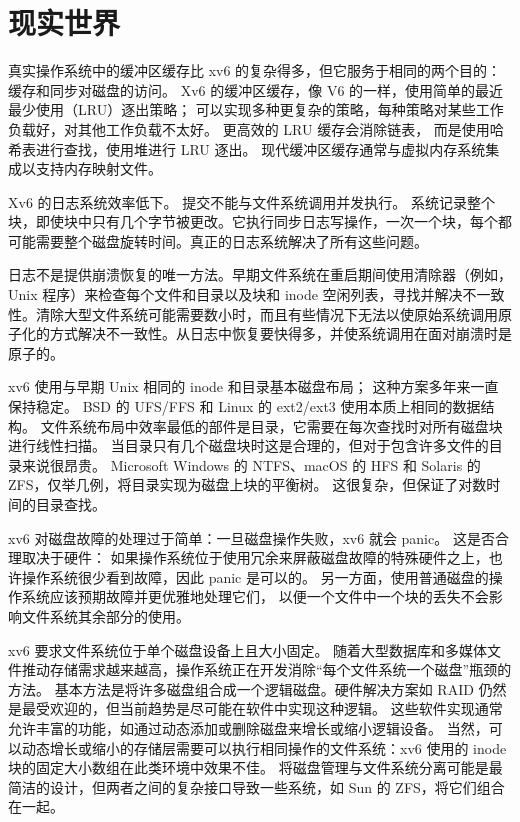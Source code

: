 \section{现实世界}

真实操作系统中的缓冲区缓存比 xv6 的复杂得多，但它服务于相同的两个目的：缓存和同步对磁盘的访问。
Xv6 的缓冲区缓存，像 V6 的一样，使用简单的最近最少使用（LRU）逐出策略；
可以实现多种更复杂的策略，每种策略对某些工作负载好，对其他工作负载不太好。
更高效的 LRU 缓存会消除链表，
而是使用哈希表进行查找，使用堆进行 LRU 逐出。
现代缓冲区缓存通常与虚拟内存系统集成以支持内存映射文件。

Xv6 的日志系统效率低下。
提交不能与文件系统调用并发执行。
系统记录整个块，即使块中只有几个字节被更改。它执行同步日志写操作，一次一个块，每个都可能需要整个磁盘旋转时间。真正的日志系统解决了所有这些问题。

日志不是提供崩溃恢复的唯一方法。早期文件系统在重启期间使用清除器（例如，Unix
程序）来检查每个文件和目录以及块和 inode 空闲列表，寻找并解决不一致性。清除大型文件系统可能需要数小时，而且有些情况下无法以使原始系统调用原子化的方式解决不一致性。从日志中恢复要快得多，并使系统调用在面对崩溃时是原子的。

xv6 使用与早期 Unix 相同的 inode 和目录基本磁盘布局；
这种方案多年来一直保持稳定。
BSD 的 UFS/FFS 和 Linux 的 ext2/ext3 使用本质上相同的数据结构。
文件系统布局中效率最低的部件是目录，它需要在每次查找时对所有磁盘块进行线性扫描。
当目录只有几个磁盘块时这是合理的，但对于包含许多文件的目录来说很昂贵。
Microsoft Windows 的 NTFS、macOS 的 HFS 和 Solaris 的 ZFS，仅举几例，将目录实现为磁盘上块的平衡树。
这很复杂，但保证了对数时间的目录查找。

 xv6 对磁盘故障的处理过于简单：一旦磁盘操作失败，xv6 就会 panic。
这是否合理取决于硬件：
如果操作系统位于使用冗余来屏蔽磁盘故障的特殊硬件之上，也许操作系统很少看到故障，因此 panic 是可以的。
另一方面，使用普通磁盘的操作系统应该预期故障并更优雅地处理它们，
以便一个文件中一个块的丢失不会影响文件系统其余部分的使用。

 xv6 要求文件系统位于单个磁盘设备上且大小固定。
随着大型数据库和多媒体文件推动存储需求越来越高，操作系统正在开发消除``每个文件系统一个磁盘''瓶颈的方法。
基本方法是将许多磁盘组合成一个逻辑磁盘。硬件解决方案如 RAID 仍然是最受欢迎的，但当前趋势是尽可能在软件中实现这种逻辑。
这些软件实现通常允许丰富的功能，如通过动态添加或删除磁盘来增长或缩小逻辑设备。
当然，可以动态增长或缩小的存储层需要可以执行相同操作的文件系统：xv6 使用的 inode 块的固定大小数组在此类环境中效果不佳。
将磁盘管理与文件系统分离可能是最简洁的设计，但两者之间的复杂接口导致一些系统，如 Sun 的 ZFS，将它们组合在一起。


